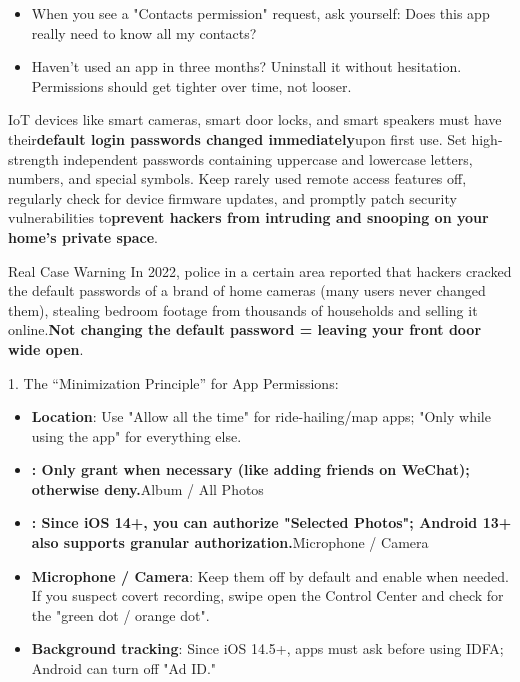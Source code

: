 \begin{itemize}
  \item When you see a "Contacts permission" request, ask yourself: Does this app really need to know all my contacts?
  \item Haven’t used an app in three months? Uninstall it without hesitation. Permissions should get tighter over time, not looser.
\end{itemize}


IoT devices like smart cameras, smart door locks, and smart speakers must have their\textbf{default login passwords changed immediately}upon first use. Set high-strength independent passwords containing uppercase and lowercase letters, numbers, and special symbols. Keep rarely used remote access features off, regularly check for device firmware updates, and promptly patch security vulnerabilities to\textbf{prevent hackers from intruding and snooping on your home's private space}.

\begin{tcbwarn}{Real Case Warning}
In 2022, police in a certain area reported that hackers cracked the default passwords of a brand of home cameras (many users never changed them), stealing bedroom footage from thousands of households and selling it online.\textbf{Not changing the default password = leaving your front door wide open}.

\end{tcbwarn}


1. The “Minimization Principle” for App Permissions:


\begin{itemize}
  \item \textbf{Location}: Use "Allow all the time" for ride-hailing/map apps; "Only while using the app" for everything else.
  \item \textbf{: Only grant when necessary (like adding friends on WeChat); otherwise deny.}Album / All Photos
  \item \textbf{: Since iOS 14+, you can authorize "Selected Photos"; Android 13+ also supports granular authorization.}Microphone / Camera
  \item \textbf{Microphone / Camera}: Keep them off by default and enable when needed. If you suspect covert recording, swipe open the Control Center and check for the "green dot / orange dot".
  \item \textbf{Background tracking}: Since iOS 14.5+, apps must ask before using IDFA; Android can turn off "Ad ID."
\end{itemize}

